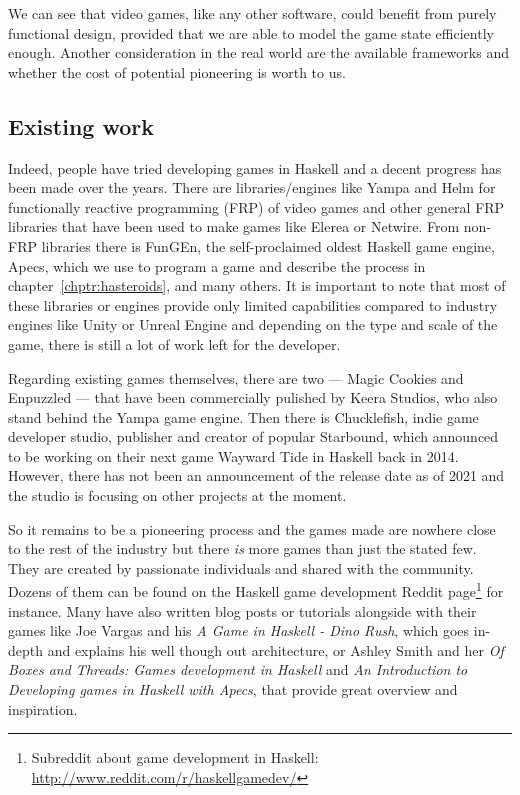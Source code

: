 \documentclass[
  digital, %
  color,   %
  table,   %
  oneside, %
  lof,     %
  lot,     %
]{fithesis3}
\begin{document}
We can see that video games, like any other software, could benefit from
purely functional design, provided that we are able to model the
game state efficiently enough. Another consideration in the real world
are the available frameworks and whether the cost of potential
pioneering is worth to us.


\subsection{Existing work}
Indeed, people have tried developing games in Haskell and a decent
progress has been made over the years. There are libraries/engines like Yampa\cite{yamparepo}
and Helm\cite{helmrepo} for functionally reactive programming (FRP) of video games and
other general FRP libraries that have been used to make games like Elerea\cite{elerearepo}
or Netwire\cite{netwirerepo}. From non-FRP libraries there is
FunGEn\cite{fungenrepo}, the self-proclaimed oldest Haskell game engine,
Apecs\cite{apecsrepo}, which we use to program a game and describe the process
in chapter~\ref{chptr:hasteroids}, and many others. It is important to note that
most of these libraries or engines provide only limited capabilities
compared to  industry engines like Unity or Unreal Engine
and depending on the type and scale of the game, there is still a lot
of work left for the developer.

Regarding existing games themselves, there are two --- Magic Cookies and
Enpuzzled --- that have been commercially pulished by Keera Studios,
who also stand behind the Yampa game engine\cite{keerastudios}.
Then there is Chucklefish, indie game developer studio, publisher and
creator of popular Starbound, which announced to be working on their next
game Wayward Tide in Haskell back in 2014\cite{waywardtide}. However, there
has not been an announcement of the release date as of 2021 and the studio is
focusing on other projects at the moment.

So it remains to be a pioneering process and the games made are nowhere close
to the rest of the industry but there \emph{is} more games than just the stated few.
They are created by passionate individuals and shared with the community. Dozens of them can be found
on the Haskell game development Reddit page\footnote{
Subreddit about game development in Haskell: \url{http://www.reddit.com/r/haskellgamedev/}
}
for instance. Many have also written blog posts or tutorials alongside with
their games like Joe Vargas and his \textit{A Game in Haskell - Dino Rush}\cite{dinorush},
which goes in-depth and explains his well though out architecture,
or Ashley Smith and her \textit{Of Boxes and Threads: Games development in Haskell}\cite{aashaskell}
and \textit{An Introduction to Developing games in Haskell with Apecs}\cite{aasapecs},
that provide great overview and inspiration.
\end{document}
